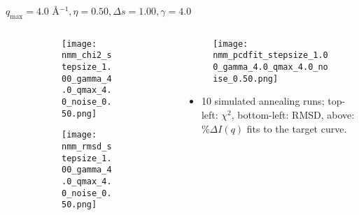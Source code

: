\documentclass{beamer}
\begin{document}
\begin{frame}{$ q_{\textrm{max}}=4.0 $ \AA $^{-1}, \eta=0.50, \Delta s=1.00, \gamma=4.0$}
	\begin{columns}
		\begin{column}{.5\textwidth}
			\begin{figure}[H]
			\centering
			\begin{subfigure}[b]{\textwidth}
				\centering
				\texttt{[image: nmm\_chi2\_stepsize\_1.00\_gamma\_4.0\_qmax\_4.0\_noise\_0.50.png]}
				\label{fig:}
			\end{subfigure}
			\begin{subfigure}[b]{\textwidth}
				\centering
				\texttt{[image: nmm\_rmsd\_stepsize\_1.00\_gamma\_4.0\_qmax\_4.0\_noise\_0.50.png]}
				\label{fig:}
			\end{subfigure}
			\end{figure}
		\end{column}
		\begin{column}{.5\textwidth}
			\begin{figure}[H]
				\centering
				\texttt{[image: nmm\_pcdfit\_stepsize\_1.00\_gamma\_4.0\_qmax\_4.0\_noise\_0.50.png]}
				\label{fig:}
			\end{figure}
			\begin{itemize}
				\item 10 simulated annealing runs; top-left: $\chi^2$, bottom-left: RMSD, above: $\%\Delta I(q)$ fits to the target curve.
			\end{itemize}
		\end{column}
	\end{columns}
\end{frame}
 
\end{document}

